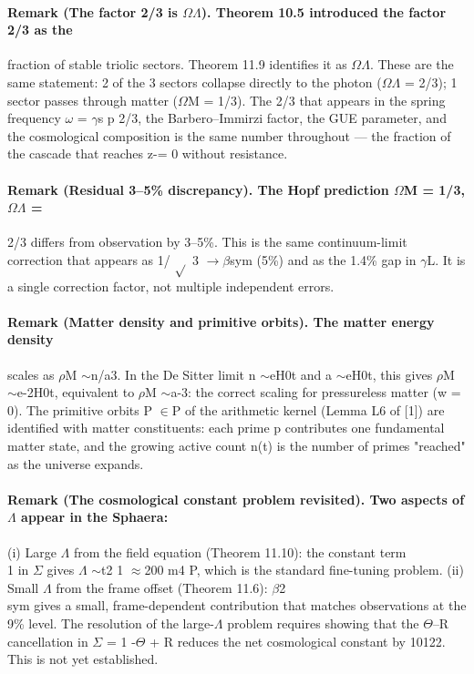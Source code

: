 \paragraph*{Remark (The factor 2/3 is $\Omega$$\Lambda$). Theorem 10.5 introduced the factor 2/3 as the}
fraction of stable triolic sectors. Theorem 11.9 identifies it as $\Omega$$\Lambda$. These are the same statement: 2 of the 3 sectors collapse directly to the photon ($\Omega$$\Lambda$ = 2/3); 1 sector passes through matter ($\Omega$M = 1/3). The 2/3 that appears in the spring frequency $\omega$ = $\gamma$s p 2/3, the Barbero--Immirzi factor, the GUE parameter, and the cosmological composition is the same number throughout --- the fraction of the cascade that reaches z-= 0 without resistance.
\paragraph*{Remark (Residual 3--5\% discrepancy). The Hopf prediction $\Omega$M = 1/3, $\Omega$$\Lambda$ =}
2/3 differs from observation by 3--5\%. This is the same continuum-limit correction that appears as 1/ $\sqrt{}$ 3 $\to$$\beta$sym (5\%) and as the 1.4\% gap in $\gamma$L. It is a single correction factor, not multiple independent errors.
\paragraph*{Remark (Matter density and primitive orbits). The matter energy density}
scales as $\rho$M $\sim$n/a3. In the De Sitter limit n $\sim$eH0t and a $\sim$eH0t, this gives $\rho$M $\sim$e-2H0t, equivalent to $\rho$M $\sim$a-3: the correct scaling for pressureless matter (w = 0). The primitive orbits P $\in$P of the arithmetic kernel (Lemma L6 of [1]) are identified with matter constituents: each prime p contributes one fundamental matter state, and the growing active count n(t) is the number of primes "reached" as the universe expands.
\paragraph*{Remark (The cosmological constant problem revisited). Two aspects of $\Lambda$ appear in the Sphaera:}
(i) Large $\Lambda$ from the field equation (Theorem 11.10): the constant term\\
1 in $\Sigma$ gives $\Lambda$ $\sim$t2 1 $\approx$200 m4 P, which is the standard fine-tuning problem.
(ii) Small $\Lambda$ from the frame offset (Theorem 11.6): $\beta$2\\
sym gives a small, frame-dependent contribution that matches observations at the 9\% level. The resolution of the large-$\Lambda$ problem requires showing that the $\Theta$--R cancellation in $\Sigma$ = 1 -$\Theta$ + R reduces the net cosmological constant by 10122. This is not yet established.
